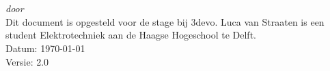 \begin{titlepage}
    \vspace*{5cm}
    \makeatletter
    \begin{center}
        \begin{Huge}
            \@title
        \end{Huge}\\[0.1cm]
        \begin{Large}
            \@subtitle
        \end{Large}\\
        \emph{door}\\
        \@author
        \vfill
        Dit document is opgesteld voor de stage bij 3devo. Luca van
        Straaten is een student Elektrotechniek aan de Haagse Hogeschool te
        Delft.\\
        \vspace{.5cm}
        Datum: \today\\
        Versie: 2.0
    \end{center}
    \makeatother
\end{titlepage}

\newpage
